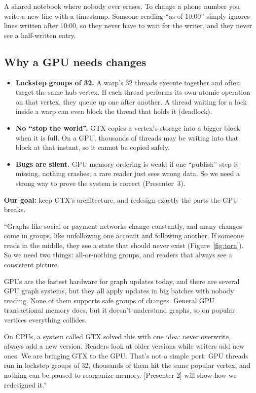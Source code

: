 \documentclass[11pt,a4paper]{article}
\begin{document}
\begin{analogy}
A shared notebook where nobody ever erases. To change a phone number you write a new line with a timestamp. Someone
reading ``as of 10:00'' simply ignores lines written after 10:00, so they never have to wait for the writer, and they
never see a half-written entry.
\end{analogy}

\subsection{Why a GPU needs changes}
\begin{itemize}
\item \textbf{Lockstep groups of 32.} A warp's 32 threads execute together and often target the same hub vertex. If each
  thread performs its own atomic operation on that vertex, they queue up one after another. A thread waiting for a
  lock inside a warp can even block the thread that holds it (deadlock).
\item \textbf{No ``stop the world''.} GTX copies a vertex's storage into a bigger block when it is full. On a GPU,
  thousands of threads may be writing into that block at that instant, so it cannot be copied safely.
\item \textbf{Bugs are silent.} GPU memory ordering is weak: if one ``publish'' step is missing, nothing crashes; a rare
  reader just sees wrong data. So we need a strong way to prove the system is correct (Presenter~3).
\end{itemize}

\textbf{Our goal:} keep GTX's architecture, and redesign exactly the parts the GPU breaks.

\begin{sayit}
``Graphs like social or payment networks change constantly, and many changes come in groups, like unfollowing one
account and following another. If someone reads in the middle, they see a state that should never exist
(Figure~\ref{fig:torn}). So we need two things: all-or-nothing groups, and readers that always see a consistent
picture.

GPUs are the fastest hardware for graph updates today, and there are several GPU graph systems, but they all apply
updates in big batches with nobody reading. None of them supports safe groups of changes. General GPU transactional
memory does, but it doesn't understand graphs, so on popular vertices everything collides.

On CPUs, a system called GTX solved this with one idea: never overwrite, always add a new version. Readers look at
older versions while writers add new ones. We are bringing GTX to the GPU. That's not a simple port: GPU threads run
in lockstep groups of 32, thousands of them hit the same popular vertex, and nothing can be paused to reorganize
memory. [Presenter 2] will show how we redesigned it.''
\end{sayit}
\end{document}

